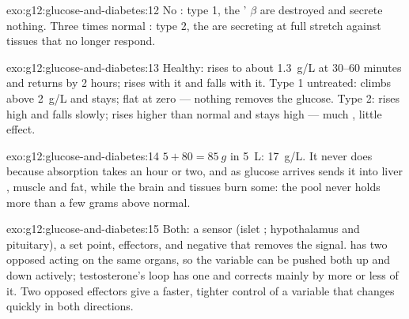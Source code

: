 \begin{solution}{exo:g12:glucose-and-diabetes:12}
No : type 1, the ' $\beta$  are destroyed and secrete
nothing. Three times normal : type 2, the  are secreting
at full stretch against tissues that no longer respond.
\end{solution}

\begin{solution}{exo:g12:glucose-and-diabetes:13}
Healthy:  rises to about \qty{1.3}{g/L} at 30--60 minutes and
returns by 2 hours;  rises with it and falls with it. Type 1
untreated:  climbs above \qty{2}{g/L} and stays;  flat
at zero --- nothing removes the glucose. Type 2:  rises high
and falls slowly;  rises higher than normal and stays high ---
much , little effect.
\end{solution}

\begin{solution}{exo:g12:glucose-and-diabetes:14}
$5 + 80 = \qty{85}{g}$ in \qty{5}{L}: \qty{17}{g/L}. It never does
because absorption takes an hour or two, and as glucose arrives
 sends it into liver , muscle  and fat, while
the brain and tissues burn some: the pool never holds more than a few
grams above normal.
\end{solution}

\begin{solution}{exo:g12:glucose-and-diabetes:15}
Both: a sensor (islet ; hypothalamus and pituitary), a set point,
effectors, and negative  that removes the signal. 
has two opposed  acting on the same organs, so the variable
can be pushed both up and down actively; testosterone's loop has one
 and corrects mainly by more or less of it. Two opposed
effectors give a faster, tighter control of a variable that changes
quickly in both directions.
\end{solution}


